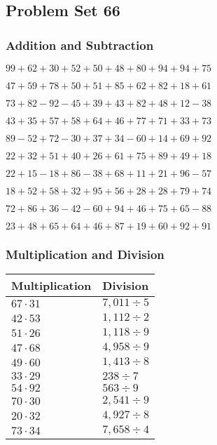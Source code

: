 \hypertarget{problem-set-66}{%
\subsection{Problem Set 66}\label{problem-set-66}}

\hypertarget{addition-and-subtraction}{%
\subsubsection{Addition and
Subtraction}\label{addition-and-subtraction}}

\(99+62+30+52+50+48+80+94+94+75\)

\(47+59+78+50+51+85+62+82+18+61\)

\(73+82-92-45+39+43+82+48+12-38\)

\(43+35+57+58+64+46+77+71+33+73\)

\(89-52+72-30+37+34-60+14+69+92\)

\(22+32+51+40+26+61+75+89+49+18\)

\(22+15-18+86-38+68+11+21+96-57\)

\(18+52+58+32+95+56+28+28+79+74\)

\(72+86+36-42-60+94+46+75+65-88\)

\(23+48+65+64+46+87+19+60+92+91\)

\hypertarget{multiplication-and-division}{%
\subsubsection{Multiplication and
Division}\label{multiplication-and-division}}

\begin{longtable}[]{@{}ll@{}}
\toprule
Multiplication & Division\tabularnewline
\midrule
\endhead
\(67\cdot31\) & \(7,011÷5\)\tabularnewline
\(42\cdot53\) & \(1,112÷2\)\tabularnewline
\(51\cdot26\) & \(1,118÷9\)\tabularnewline
\(47\cdot68\) & \(4,958÷9\)\tabularnewline
\(49\cdot60\) & \(1,413÷8\)\tabularnewline
\(33\cdot29\) & \(238÷7\)\tabularnewline
\(54\cdot92\) & \(563÷9\)\tabularnewline
\(70\cdot30\) & \(2,541 ÷9\)\tabularnewline
\(20\cdot32\) & \(4,927÷8\)\tabularnewline
\(73\cdot34\) & \(7,658÷4\)\tabularnewline
\bottomrule
\end{longtable}

